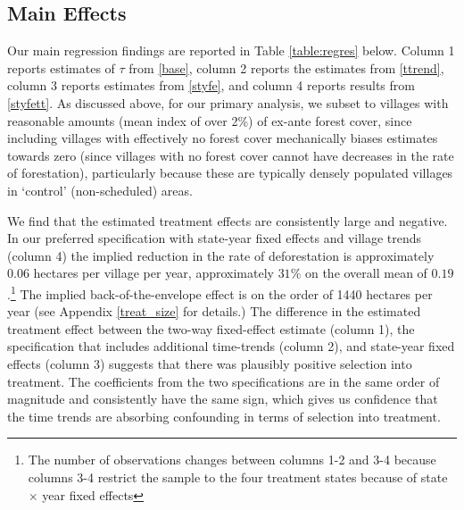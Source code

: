 \documentclass[12pt,reqno]{article}
\begin{document}
\subsection{Main Effects\label{MainEffects}}
Our main regression findings are reported in Table \ref{table:regres} below. Column 1 reports estimates of $\tau$ from \ref{base}, column 2 reports the estimates from \ref{ttrend}, column 3 reports estimates from \ref{styfe},
and column 4 reports results from \ref{styfett}. As discussed above, for our primary analysis, we subset to villages with reasonable amounts (mean index of over 2\%) of ex-ante forest cover, since including villages with effectively no forest cover mechanically biases estimates towards zero (since villages with no forest cover cannot have decreases in the rate of forestation), particularly because these are typically densely populated villages in `control' (non-scheduled) areas.



We find that the estimated treatment effects are consistently large and negative. In our preferred specification with state-year fixed effects and village trends (column 4) the implied reduction in the rate of deforestation is approximately $0.06$ hectares per village per year, approximately $31\%$ on the overall mean of $0.19$.\footnote{The number of observations changes between columns 1-2 and 3-4 because columns 3-4 restrict the sample to the four treatment states because of state $\times$ year fixed effects} The implied back-of-the-envelope effect is on the order of 1440 hectares per year (see Appendix \ref{treat_size} for details.) The difference in the estimated treatment effect between the two-way fixed-effect estimate (column 1), the specification that includes additional time-trends (column 2), and state-year fixed effects (column 3) suggests that there was plausibly positive selection into treatment. The coefficients from the two specifications are in the same order of magnitude and consistently have the same sign, which gives us confidence that the time trends are absorbing confounding in terms of selection into treatment.%


\end{document}

